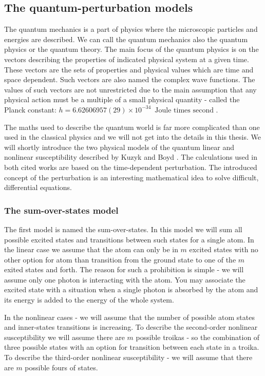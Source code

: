 \documentclass[12pt,twoside,a4paper]{article}
\numberwithin{equation}{subsection}
\numberwithin{figure}{subsection}
\begin{document}
\subsection{The quantum-perturbation models} \label{chap:problem_quantum}
The quantum mechanics is a part of physics where the microscopic particles and energies are described. We can call the quantum mechanics also the quantum physics or the quantum theory. The main focus of the quantum physics is on the vectors describing the properties of indicated physical system at a given time. These vectors are the sets of properties and physical values which are time and space dependent. Such vectors are also named the complex wave functions. The values of such vectors are not unrestricted due to the main assumption that any physical action must be a multiple of a small physical quantity - called the Planck constant: $h = 6.62606957(29) \times 10^{-34} \, \text{ Joule times second } $.

The maths used to describe the quantum world is far more complicated than one used in the classical physics and we will not get into the details in this thesis. We will shortly introduce the two physical models of the quantum linear and nonlinear susceptibility described by Kuzyk \cite{kuzyk_nlo} and Boyd \cite{boyd_nlo}. The calculations used in both cited works are based on the time-dependent perturbation. The introduced concept of the perturbation is an interesting mathematical idea to solve difficult, differential equations.

\subsubsection*{The sum-over-states model}

The first model is named the sum-over-states. In this model we will sum all possible excited states and transitions between such states for a single atom. In the linear case we assume that the atom can only be in $m$ excited states with no other option for atom than transition from the ground state to one of the $m$ exited states and forth. The reason for such a prohibition is simple - we will assume only one photon is interacting with the atom. You may associate the excited state with a situation when a single photon is absorbed by the atom and its energy is added to the energy of the whole system.

In the nonlinear cases - we will assume that the number of possible atom states and inner-states transitions is increasing. To describe the second-order nonlinear susceptibility we will assume there are $m$ possible troikas - so the combination of three possible states with an option for transition between each state in a troika. To describe the third-order nonlinear susceptibility - we will assume that there are $m$ possible fours of states.
\end{document}
